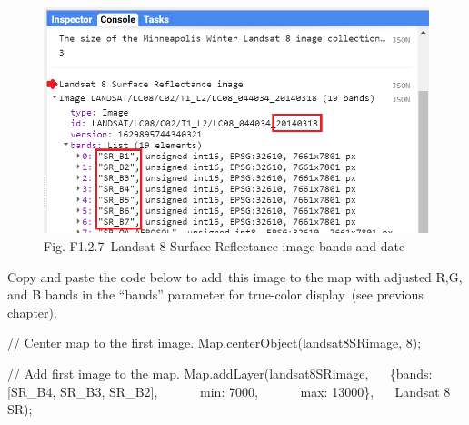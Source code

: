 \documentclass[
  letterpaper,
  DIV=11,
  numbers=noendperiod]{scrreprt}
\newenvironment{Shaded}{\begin{snugshade}}{\end{snugshade}}
\newcommand{\BuiltInTok}[1]{\textcolor[rgb]{0.00,0.23,0.31}{#1}}
\newcommand{\CommentTok}[1]{\textcolor[rgb]{0.37,0.37,0.37}{#1}}
\newcommand{\DataTypeTok}[1]{\textcolor[rgb]{0.68,0.00,0.00}{#1}}
\newcommand{\DecValTok}[1]{\textcolor[rgb]{0.68,0.00,0.00}{#1}}
\newcommand{\FunctionTok}[1]{\textcolor[rgb]{0.28,0.35,0.67}{#1}}
\newcommand{\NormalTok}[1]{\textcolor[rgb]{0.00,0.23,0.31}{#1}}
\newcommand{\OperatorTok}[1]{\textcolor[rgb]{0.37,0.37,0.37}{#1}}
\newcommand{\StringTok}[1]{\textcolor[rgb]{0.13,0.47,0.30}{#1}}
\begin{document}
\begin{figure}

{\centering \includegraphics{./F1/image30.png}

}

\caption{Fig. F1.2.7~Landsat 8 Surface Reflectance image bands and date}

\end{figure}

Copy and paste the code below to add~this image to the map with adjusted
R,G, and B bands in the ``bands'' parameter for true-color display~(see
previous chapter).

\begin{Shaded}
\begin{Highlighting}[]
\CommentTok{// Center map to the first image.  }
\BuiltInTok{Map}\OperatorTok{.}\FunctionTok{centerObject}\NormalTok{(landsat8SRimage}\OperatorTok{,} \DecValTok{8}\NormalTok{)}\OperatorTok{;}  
  
\CommentTok{// Add first image to the map.  }
\BuiltInTok{Map}\OperatorTok{.}\FunctionTok{addLayer}\NormalTok{(landsat8SRimage}\OperatorTok{,}  
\NormalTok{   \{}\DataTypeTok{bands}\OperatorTok{:}\NormalTok{ [}\StringTok{\textquotesingle{}SR\_B4\textquotesingle{}}\OperatorTok{,} \StringTok{\textquotesingle{}SR\_B3\textquotesingle{}}\OperatorTok{,} \StringTok{\textquotesingle{}SR\_B2\textquotesingle{}}\NormalTok{]}\OperatorTok{,}  
      \DataTypeTok{ min}\OperatorTok{:} \DecValTok{7000}\OperatorTok{,}  
      \DataTypeTok{ max}\OperatorTok{:} \DecValTok{13000}\NormalTok{\}}\OperatorTok{,}   
    \StringTok{\textquotesingle{}Landsat 8 SR\textquotesingle{}}\NormalTok{)}\OperatorTok{;}
\end{Highlighting}
\end{Shaded}
\end{document}
